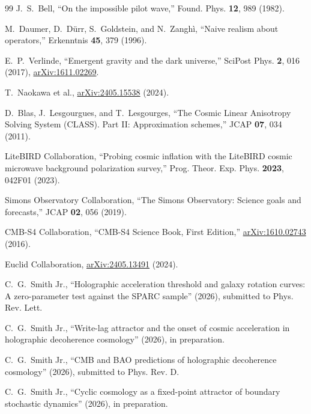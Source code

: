 \documentclass[aps,prd,twocolumn,superscriptaddress,nofootinbib]{revtex4-2}
\begin{document}
\begin{thebibliography}{99}
 J.~S.~Bell, ``On the impossible pilot wave,'' Found. Phys. \textbf{12}, 989 (1982).

 M.~Daumer, D.~D\"{u}rr, S.~Goldstein, and N.~Zangh\`{i}, ``Naive realism about operators,'' Erkenntnis \textbf{45}, 379 (1996).

 E.~P.~Verlinde, ``Emergent gravity and the dark universe,'' SciPost Phys. \textbf{2}, 016 (2017), \href{https://arxiv.org/abs/1611.02269}{arXiv:1611.02269}.

 T.~Naokawa et al., \href{https://arxiv.org/abs/2405.15538}{arXiv:2405.15538} (2024).

 D.~Blas, J.~Lesgourgues, and T.~Lesgourges, ``The Cosmic Linear Anisotropy Solving System (CLASS). Part II: Approximation schemes,'' JCAP \textbf{07}, 034 (2011).

 LiteBIRD Collaboration, ``Probing cosmic inflation with the LiteBIRD cosmic microwave background polarization survey,'' Prog. Theor. Exp. Phys. \textbf{2023}, 042F01 (2023).

 Simons Observatory Collaboration, ``The Simons Observatory: Science goals and forecasts,'' JCAP \textbf{02}, 056 (2019).

 CMB-S4 Collaboration, ``CMB-S4 Science Book, First Edition,'' \href{https://arxiv.org/abs/1610.02743}{arXiv:1610.02743} (2016).

 Euclid Collaboration, \href{https://arxiv.org/abs/2405.13491}{arXiv:2405.13491} (2024).

 C.~G.~Smith Jr., ``Holographic acceleration threshold and galaxy rotation curves: A zero-parameter test against the SPARC sample'' (2026), submitted to Phys. Rev. Lett.

 C.~G.~Smith Jr., ``Write-lag attractor and the onset of cosmic acceleration in holographic decoherence cosmology'' (2026), in preparation.

 C.~G.~Smith Jr., ``CMB and BAO predictions of holographic decoherence cosmology'' (2026), submitted to Phys. Rev. D.

 C.~G.~Smith Jr., ``Cyclic cosmology as a fixed-point attractor of boundary stochastic dynamics'' (2026), in preparation.

\end{thebibliography}
\end{document}
